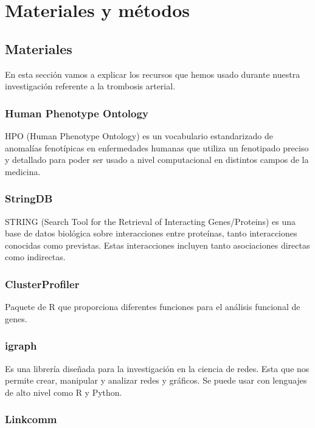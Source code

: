 
\section{Materiales y métodos}

\subsection{Materiales}

En esta sección vamos a explicar los recursos que hemos usado durante nuestra investigación referente a la trombosis arterial.

\subsubsection{Human Phenotype Ontology}

HPO (Human Phenotype Ontology)\cite{HPO} es un vocabulario estandarizado de anomalías fenotípicas en enfermedades humanas que utiliza un fenotipado preciso y detallado para poder ser usado a nivel computacional en distintos campos de la medicina.


\subsubsection{StringDB}

STRING (Search Tool for the Retrieval of Interacting Genes/Proteins) \cite{STRING} es una base de datos biológica sobre interacciones entre proteínas, tanto interacciones conocidas como previstas. Estas interacciones incluyen tanto asociaciones directas como indirectas.

\subsubsection{ClusterProfiler}

Paquete de R que proporciona diferentes funciones para el análisis funcional de genes.

\subsubsection{igraph}

Es una librería diseñada para la investigación en la ciencia de redes. Esta que nos permite crear, manipular y analizar redes y gráficos. Se puede usar con lenguajes de alto nivel como R y Python.

\subsubsection{Linkcomm}


